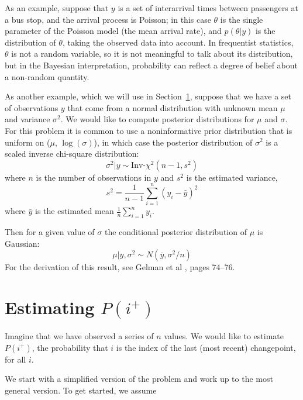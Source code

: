 \documentclass[twocolumn,11pt]{article}
\begin{document}
As an example, suppose that $y$ is a set of interarrival times between
passengers at a bus stop, and the arrival process is Poisson; in this
case $\theta$ is the single parameter of the Poisson model (the mean
arrival rate), and $p(\theta|y)$ is the distribution of $\theta$,
taking the observed data into account.  In frequentist statistics,
$\theta$ is not a random variable, so it is not meaningful to talk
about its distribution, but in the Bayesian interpretation,
probability can reflect a degree of belief about a non-random
quantity.

As another example, which we will use in Section~\ref{estimation},
suppose that we have a set of observations $y$ that come from a normal
distribution with unknown mean $\mu$ and variance $\sigma^2$.  We
would like to compute posterior distributions for $\mu$ and $\sigma$.
For this problem it is common to use a noninformative prior
distribution that is uniform on ($\mu$, $\log (\sigma)$), in which
case the posterior distribution of $\sigma^2$ is a scaled inverse
chi-square distribution:
%
\begin{equation}
\label{sigmapost}
\sigma^2|y \sim \mbox{Inv-} \chi ^2(n-1, s^2)
\end{equation}
%
where $n$ is the number of observations in $y$ and $s^2$ is
the estimated variance,
%
\begin{equation}
s^2 = \frac{1}{n-1} \sum_{i=1}^n (y_i - \bar{y})^2
\end{equation}
%
where $\bar{y}$ is the estimated mean $\frac{1}{n} \sum_{i=1}^n y_i$.

Then for a given value of $\sigma$ the conditional posterior
distribution of $\mu$ is Gaussian:
%
\begin{equation}
\label{mupost}
\mu|y,\sigma^2 \sim N(\bar{y}, \sigma^2/n )
\end{equation}
%
For the derivation of this result, see Gelman et al
\cite{gelman03bayesian}, pages 74--76.



\section{Estimating $P(i^+)$}
\label{estimation}

Imagine that we have observed a series of $n$ values.  We would like
to estimate $P(i^+)$, the probability that $i$ is the index of the last
(most recent) changepoint, for all $i$.

We start with a simplified version of the problem and work
up to the most general version.
To get started, we assume 
\end{document}
